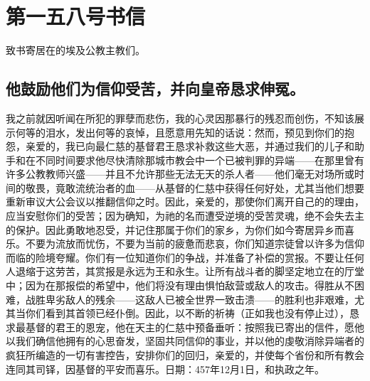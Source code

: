 

\section{第一五八号书信}

致书寄居在的埃及公教主教们。\par


\subsection{他鼓励他们为信仰受苦，并向皇帝恳求伸冤。}

我之前就因听闻在所犯的罪孽而悲伤，我的心灵因那暴行的残忍而创伤，不知该展示何等的泪水，发出何等的哀悼，且愿意用先知的话说：然而，预见到你们的抱怨，亲爱的，我已向最仁慈的基督君王恳求补救这些大恶，并通过我们的儿子和助手和在不同时间要求他尽快清除那城市教会中一个已被判罪的异端——在那里曾有许多公教教师兴盛——并且不允许那些无法无天的杀人者——他们毫无对场所或时间的敬畏，竟敢流统治者的血——从基督的仁慈中获得任何好处，尤其当他们想要重新审议大公会议以推翻信仰之时。因此，亲爱的，那使你们离开自己的的理由，应当安慰你们的受苦；因为确知，为祂的名而遭受逆境的受苦灵魂，绝不会失去主的保护。因此勇敢地忍受，并记住那属于你们的家乡，为你们如今寄居异乡而喜乐。不要为流放而忧伤，不要为当前的疲惫而悲哀，你们知道宗徒曾以许多为信仰而临的险境夸耀。你们有一位知道你们的争战，并准备了补偿的赏报。不要让任何人退缩于这劳苦，其赏报是永远为王和永生。让所有战斗者的脚坚定地立在的厅堂中；因为在那报偿的希望中，他们将没有理由惧怕敌营或敌人的攻击。得胜从不困难，战胜卑劣敌人的残余——这敌人已被全世界一致击溃——的胜利也非艰难，尤其当你们看到其首领已经仆倒。因此，以不断的祈祷（正如我也没有停止过），恳求最基督的君王的恩宠，他在天主的仁慈中预备垂听：按照我已寄出的信件，愿他以我们确信他拥有的心思奋发，坚固共同信仰的事业，并以他的虔敬消除异端者的疯狂所编造的一切有害控告，安排你们的回归，亲爱的，并使每个省份和所有教会连同其司铎，因基督的平安而喜乐。日期：457年12月1日，和执政之年。\par

